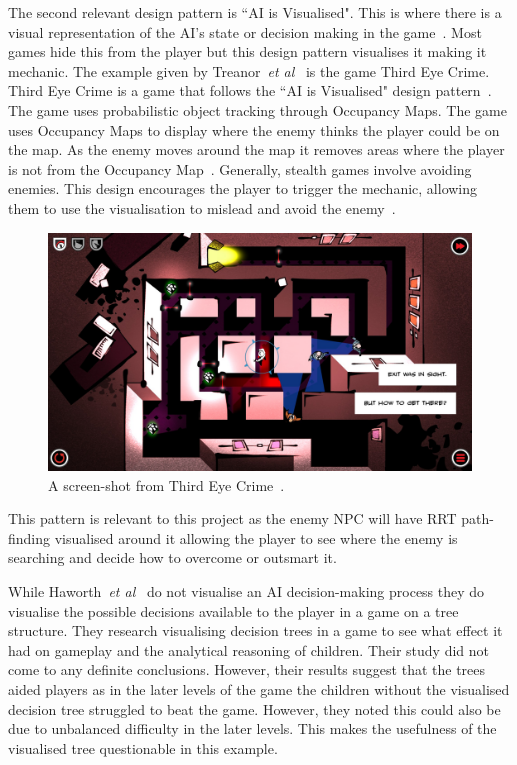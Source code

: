 \documentclass[journal]{IEEEtran}
\begin{document}
The second relevant design pattern is ``AI is Visualised".  This is where there is a visual representation of the AI's state or decision making in the game~\cite{treanor2015}. Most games hide this from the player but this design pattern visualises it making it mechanic.  
The example given by Treanor~\textit{et al}~\cite{treanor2015} is the game Third Eye Crime.  Third Eye Crime is a game that follows the ``AI is Visualised" design pattern~\cite{Isla2014, game:ThirdEyeCrime}. The game uses probabilistic object tracking through Occupancy Maps. The game uses Occupancy Maps to display where the enemy thinks the player could be on the map. As the enemy moves around the map it removes areas where the player is not from the Occupancy Map~\cite{Isla2014}.  Generally, stealth games involve avoiding enemies.  This design encourages the player to trigger the mechanic, allowing them to use the visualisation to mislead and avoid the enemy~\cite{Isla2014, game:ThirdEyeCrime}. 

\begin{figure}[h]
	\includegraphics[width=1.0\linewidth]{ThirdEyeCrime.jpg}
	\caption{ A screen-shot from Third Eye Crime~\cite{game:ThirdEyeCrime}.}
	\label{image:ThirdEyeCrime}
\end{figure}  

This pattern is relevant to this project as the enemy NPC will have RRT path-finding visualised around it allowing the player to see where the enemy is searching and decide how to overcome or outsmart it.

While Haworth~\textit{et al}~\cite{Haworth2010} do not visualise an AI decision-making process they do visualise the possible decisions available to the player in a game on a tree structure.   They research visualising decision trees in a game to see what effect it had on gameplay and the analytical reasoning of children.  
Their study did not come to any definite conclusions. However, their results suggest that the trees aided players as in the later levels of the game the children without the visualised decision tree struggled to beat the game. However, they noted this could also be due to unbalanced difficulty in the later levels. This makes the usefulness of the visualised tree questionable in this example.  
\end{document}
